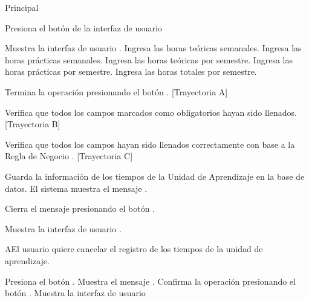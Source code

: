 \begin{UCtrayectoria}{Principal}

\UCpaso[\UCactor] Presiona el botón  de la interfaz de usuario 

\UCpaso Muestra la interfaz de usuario .
\UCpaso[\UCactor] Ingresa las horas teóricas semanales.
\UCpaso[\UCactor] Ingresa las horas prácticas semanales. 
\UCpaso[\UCactor] Ingresa las horas teóricas por semestre.
\UCpaso[\UCactor] Ingresa las horas prácticas por semestre.
\UCpaso[\UCactor] Ingresa las horas totales por semestre.

\UCpaso[\UCactor] Termina la operación presionando el botón . [Trayectoria A] 

\UCpaso Verifica que todos los campos marcados como obligatorios hayan sido llenados. [Trayectoria B]

\UCpaso Verifica que todos los campos hayan sido llenados correctamente con base a la Regla de Negocio \UCBussinesRule{}{}. [Trayectoria C]


\UCpaso Guarda la información de los tiempos de la Unidad de Aprendizaje en la base de datos.
\UCpaso El sistema muestra el mensaje .

\UCpaso[\UCactor] Cierra el mensaje presionando el botón .

\UCpaso Muestra la interfaz de usuario .
\end{UCtrayectoria}


\begin{UCtrayectoriaA}{A}{El usuario quiere cancelar el registro de los tiempos de la unidad de aprendizaje.}

\UCpaso[\UCactor] Presiona el botón .
\UCpaso Muestra el mensaje .
\UCpaso[\UCactor] Confirma la operación presionando el botón .
\UCpaso Muestra la interfaz de usuario 

\end{UCtrayectoriaA}


